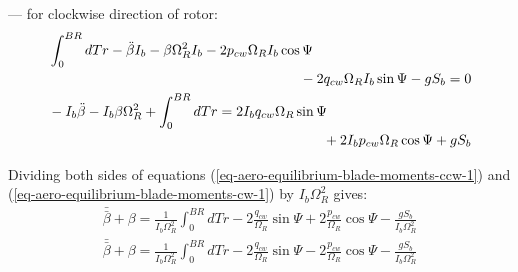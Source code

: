 --- for clockwise direction of rotor:
\begin{gather}
  \begin{multlined}[0.88\textwidth]
    \int_{0}^{BR} dT r
    - \ddot \beta I_b
    - \beta \Omega_R^2 I_b
    - 2 p_{cw} \Omega_R I_b \cos \Psi \\
    - 2 q_{cw} \Omega_R I_b \sin \Psi
    - g S_b
    = 0
  \end{multlined}
  \\
  \begin{multlined}[0.88\textwidth]
    \label{eq-aero-equilibrium-blade-moments-cw-1}
    - I_b \ddot \beta
    - I_b \beta \Omega_R^2
    + \int_{0}^{BR} dT r
    = 2 I_b q_{cw} \Omega_R \sin \Psi \\
    + 2 I_b p_{cw} \Omega_R \cos \Psi
    + g S_b
  \end{multlined}
\end{gather}

Dividing both sides of equations (\ref{eq-aero-equilibrium-blade-moments-ccw-1}) and (\ref{eq-aero-equilibrium-blade-moments-cw-1}) by $I_b \Omega_R^2$ gives:
\begin{gather}
  \label{eq-aero-equilibrium-blade-moments-ccw-2}
  \bar{\bar \beta} + \beta
  = \frac{1}{ I_b \Omega_R^2 } \int_{0}^{BR} dT r
  - 2 \frac{q_{cw}}{\Omega_R} \sin \Psi
  + 2 \frac{p_{cw}}{\Omega_R} \cos \Psi
  - \frac{g S_b}{I_b \Omega_R^2} \\
  \label{eq-aero-equilibrium-blade-moments-cw-2}
    \bar{\bar \beta} + \beta
  = \frac{1}{ I_b \Omega_R^2 } \int_{0}^{BR} dT r
  - 2 \frac{q_{cw}}{\Omega_R} \sin \Psi
  - 2 \frac{p_{cw}}{\Omega_R} \cos \Psi
  - \frac{g S_b}{I_b \Omega_R^2}
\end{gather}

